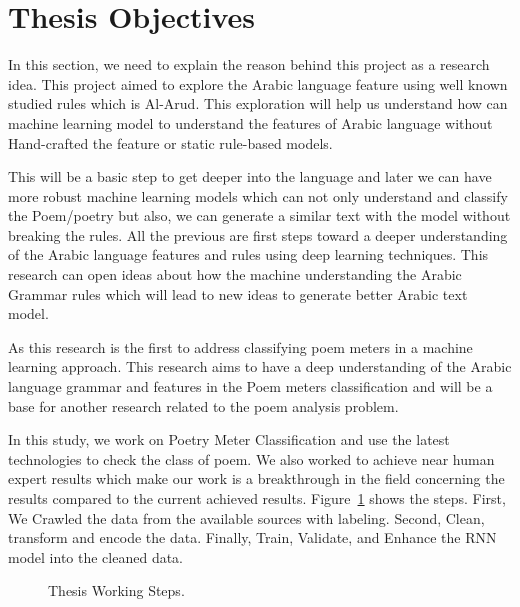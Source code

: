 \section{Thesis Objectives}
In this section, we need to explain the reason behind this project as a research idea. This project aimed to explore the Arabic language feature using well known studied rules which is Al-Arud. This exploration will help us understand how can machine learning model to understand the features of Arabic language without Hand-crafted the feature or static rule-based models.

This will be a basic step to get deeper into the language and later we can have more robust machine learning models which can not only understand and classify the Poem/poetry but also, we can generate a similar text with the model without breaking the rules. All the previous are first steps toward a deeper understanding of the Arabic language features and rules using deep learning techniques. This research can open ideas about how the machine understanding the Arabic Grammar rules which will lead to new ideas to generate better Arabic text model.

As this research is the first to address classifying poem meters in a machine learning approach. This research aims to have a deep understanding of the Arabic language grammar and features in the Poem meters classification and will be a base for another research related to the poem analysis problem.


In this study, we work on Poetry Meter Classification and use the latest technologies to check the class of poem. We also worked to achieve near human expert results which make our work is a breakthrough in the field concerning the results compared to the current achieved results. Figure~\ref{Fig:Thesis_Cycle} shows the steps. First, We Crawled the data from the available sources with labeling. Second, Clean, transform and encode the data. Finally, Train, Validate, and Enhance the RNN model into the cleaned data.

\begin{figure}[!t]
   
  \caption{Thesis Working Steps.}
  \label{Fig:Thesis_Cycle}
\end{figure}


\clearpage


%	
%	
%	



